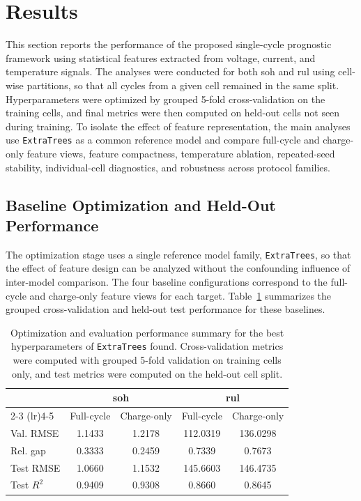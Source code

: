\section{Results}

This section reports the performance of the proposed single-cycle prognostic framework using statistical features extracted from voltage, current, and temperature signals. The analyses were conducted for both \ac{soh} and \ac{rul} using cell-wise partitions, so that all cycles from a given cell remained in the same split. Hyperparameters were optimized by grouped 5-fold cross-validation on the training cells, and final metrics were then computed on held-out cells not seen during training. To isolate the effect of feature representation, the main analyses use \texttt{ExtraTrees} as a common reference model and compare full-cycle and charge-only feature views, feature compactness, temperature ablation, repeated-seed stability, individual-cell diagnostics, and robustness across protocol families.

\subsection{Baseline Optimization and Held-Out Performance}

The optimization stage uses a single reference model family, \texttt{ExtraTrees}, so that the effect of feature design can be analyzed without the confounding influence of inter-model comparison. The four baseline configurations correspond to the full-cycle and charge-only feature views for each target. Table~\cref{tab:baseline_optimization_summary} summarizes the grouped cross-validation and held-out test performance for these baselines.

\begin{table}[H]
    \centering
    \caption{Optimization and evaluation performance summary for the best hyperparameters of \texttt{ExtraTrees} found. Cross-validation metrics were computed with grouped 5-fold validation on training cells only, and test metrics were computed on the held-out cell split.}
    \label{tab:baseline_optimization_summary}
    \begin{tabular}{lcccc}
    \toprule
     & \multicolumn{2}{c}{\ac{soh}} & \multicolumn{2}{c}{\ac{rul}} \\
    \cmidrule(lr){2-3} \cmidrule(lr){4-5}
     & Full-cycle & Charge-only & Full-cycle & Charge-only \\
    \midrule
    Val. RMSE & 1.1433 & 1.2178 & 112.0319 & 136.0298 \\
    Rel. gap & 0.3333 & 0.2459 & 0.7339 & 0.7673 \\
    Test RMSE & 1.0660 & 1.1532 & 145.6603 & 146.4735 \\
    Test $R^2$ & 0.9409 & 0.9308 & 0.8660 & 0.8645 \\
    \bottomrule
    \end{tabular}
\end{table}

